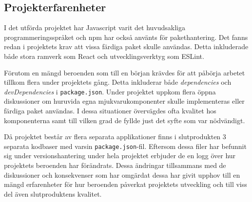 \subsection{Projekterfarenheter}
I det utförda projektet har Javascript varit det huvudsakliga programmeringsspråket och npm har också använts för pakethantering. Det fanns redan i projektets krav att vissa färdiga paket skulle användas. Detta inkluderade både stora ramverk som React och utvecklingsverktyg som ESLint.

Förutom en mängd beroenden som till en början krävdes för att påbörja arbetet tillkom flera under projektets gång. Detta inkluderar både \textit{dependencies} och \textit{devDependencies} i \texttt{package.json}. Under projektet uppkom flera öppna diskussioner om huruvida egna mjukvarukomponenter skulle implementeras eller färdiga paket användas. I dessa situationer övervägdes ofta kvalitet hos komponenterna samt till vilken grad de fyllde just det syfte som var nödvändigt.

Då projektet består av flera separata applikationer finns i slutprodukten 3 separata kodbaser med varsin \texttt{package.json}-fil. Eftersom dessa filer har befunnit sig under versionshantering under hela projektet erbjuder de en logg över hur projektets beroenden har förändrats. Dessa ändringar tillsammans med de diskussioner och konsekvenser som har omgärdat dessa har givit upphov till en mängd erfarenheter för hur beroenden påverkat projektets utveckling och till viss del även slutproduktens kvalitet.

